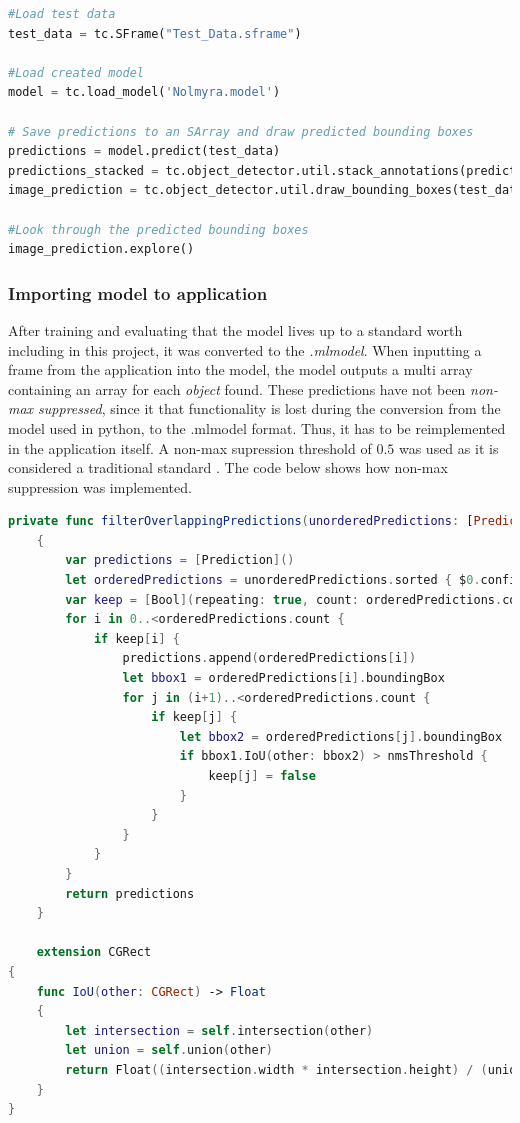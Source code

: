 \begin{lstlisting}[language=python]
#Load test data
test_data = tc.SFrame("Test_Data.sframe")

#Load created model
model = tc.load_model('Nolmyra.model')

# Save predictions to an SArray and draw predicted bounding boxes
predictions = model.predict(test_data)
predictions_stacked = tc.object_detector.util.stack_annotations(predictions)
image_prediction = tc.object_detector.util.draw_bounding_boxes(test_data['image'], predictions)

#Look through the predicted bounding boxes
image_prediction.explore()
\end{lstlisting}

\subsubsection{Importing model to application}

After training and evaluating that the model lives up to a standard worth including in this
 project, it was converted to the \textit{.mlmodel}. When inputting a frame from the
application into the model, the model outputs a multi array containing an array for each
  \textit{object} found. These predictions have not been \textit{non-max suppressed}, since it that functionality is lost during the conversion from the model used in python, to the .mlmodel format. Thus, it has to be reimplemented in the application itself. 
  A non-max supression threshold of $0.5$ was used as it is considered a traditional standard \cite{nms}. The code below shows how non-max suppression was implemented. 

\begin{lstlisting}[language=swift]
    private func filterOverlappingPredictions(unorderedPredictions: [Prediction], nmsThreshold: Float) -> [Prediction]
    {
        var predictions = [Prediction]()
        let orderedPredictions = unorderedPredictions.sorted { $0.confidence > $1.confidence }
        var keep = [Bool](repeating: true, count: orderedPredictions.count)
        for i in 0..<orderedPredictions.count {
            if keep[i] {
                predictions.append(orderedPredictions[i])
                let bbox1 = orderedPredictions[i].boundingBox
                for j in (i+1)..<orderedPredictions.count {
                    if keep[j] {
                        let bbox2 = orderedPredictions[j].boundingBox
                        if bbox1.IoU(other: bbox2) > nmsThreshold {
                            keep[j] = false
                        }
                    }
                }
            }
        }
        return predictions
    }
    
    extension CGRect
{
    func IoU(other: CGRect) -> Float
    {
        let intersection = self.intersection(other)
        let union = self.union(other)
        return Float((intersection.width * intersection.height) / (union.width * union.height))
    }
}
\end{lstlisting}



